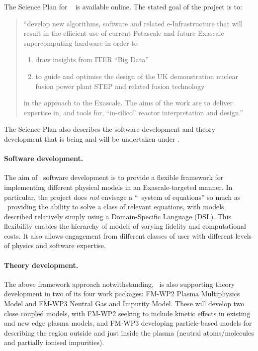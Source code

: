 The Science Plan for \nep\ \cite{sciplan} is available online.
The stated goal of the project is to:
{\green 
\begin{quote}
	``develop new algorithms, software and related e-Infrastructure that will result in the efficient use of current Petascale and future Exascale supercomputing hardware in order to
\begin{enumerate}
	\item draw insights from ITER ``Big Data''
	\item to guide and optimise the design of the UK demonstration nuclear
		fusion power plant STEP and related fusion technology
\end{enumerate}
in the approach to the Exascale. The aims of the work are to deliver expertise in,
and tools for, ``in-silico'' reactor interpretation and design.''
\end{quote}}

The Science Plan also describes the software development and theory development
that is being and will be undertaken under \nep.

\paragraph{Software development.}
The aim of \nep\ software development is to provide a flexible framework for
implementing different physical models in an Exascale-targeted manner.
In particular, the project does \emph{not} envisage a ``\nep\ system of equations'' so
much as \nep\ providing the ability to solve a class of relevant equations,
with models described relatively simply using a Domain-Specific Language (DSL).
This flexibility enables the hierarchy of models of varying fidelity and
computational costs.
It also allows engagement from different classes of user with different levels
of physics and software expertise.

\paragraph{Theory development.}
The above framework approach notwithstanding,
\nep\ is also supporting theory development in two of its four work packages:
FM-WP2 Plasma Multiphysics Model and FM-WP3 Neutral Gas and Impurity Model.
These will develop two close coupled models, with FM-WP2 seeking to include
kinetic effects in existing and new edge plasma models, and FM-WP3 developing
particle-based models for describing the region outside and just inside the
plasma (neutral atoms/molecules and partially ionised impurities).

